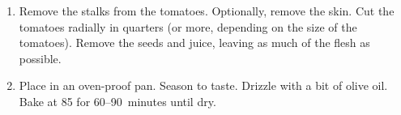 
\begin{ingredients}
\end{ingredients}


\begin{recipe}
  \begin{enumerate}

  \item Remove the stalks from the tomatoes.  Optionally, remove the
    skin.  Cut the tomatoes radially in quarters (or more, depending
    on the size of the tomatoes).  Remove the seeds and juice, leaving
    as much of the flesh as possible.

  \item Place in an oven-proof pan.  Season to taste.  Drizzle with a
    bit of olive oil.  Bake at 85\C{} for 60--90~minutes until dry.

  \end{enumerate}
\end{recipe}

